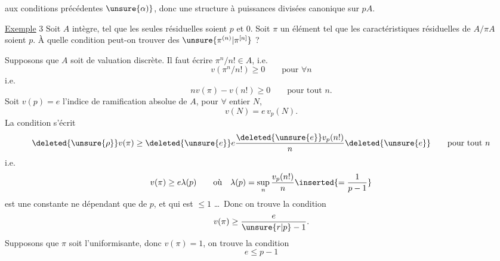  aux conditions précédentes $\unsure{\alpha)}$, donc une structure à puissances divisées canonique sur $pA$.

\uline{Exemple} 3 \quad Soit $A$ intègre,  tel que les seules   résiduelles soient $p$ et $0$. Soit $\pi$ un élément tel que les caractéristiques résiduelles de $A/\pi A$ soient $p$. À quelle condition peut-on trouver des $\unsure{\pi^{(n)}|\pi^{[n]}}$ ?

Supposons que $A$ soit de valuation discrète. Il faut écrire \deleted{$\unsure{\forall}$} $\pi^n/n!\in A$, i.e.
\[
v(\pi^n/n!)\geq 0\qquad\text{pour }\forall n
\]
i.e.
\[
n v(\pi)-v(n!)\geq0\qquad\text{pour tout }n.
\]
Soit  $v(p)=e$ l'indice de ramification absolue de $A$,   pour $\forall$ entier $N$,
\[
v(N)=e\,v_p(N).
\]
 La condition s'écrit
\[
\deleted{\unsure{\rho}}v(\pi)\geq\deleted{\unsure{e}}e\frac{\deleted{\unsure{e}}v_p(n!)}{n}\deleted{\unsure{e}}\qquad\text{pour tout }n
\]
i.e.
\[
v(\pi)\geq e\lambda(p)\qquad\text{où}\quad\lambda(p)=\sup_n\frac{v_p(n!)}{n}\inserted{=\frac1{p-1}}
\]
est une constante ne dépendant que de $p$, et qui est $\leq1$ \ldots\ Donc on trouve la condition
\[
v(\pi)\geq\frac{e}{\unsure{r|p}-1}.
\]
Supposons que $\pi$ soit l'uniformisante, donc $v(\pi)=1$, on trouve la condition
\[
\boxed{e\leq p-1}
\]
